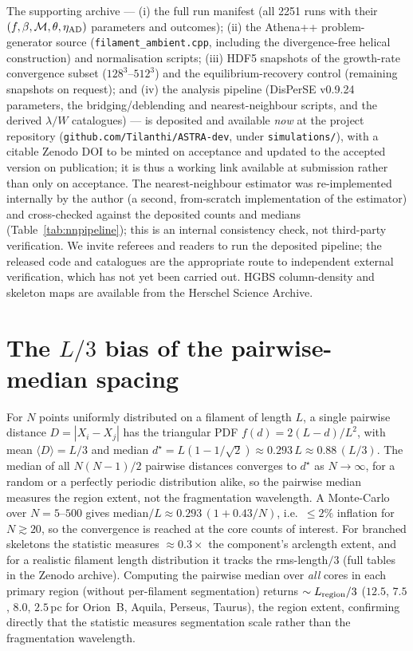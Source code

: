\documentclass[usenatbib,twoside,twocolumn]{mnras}
\begin{document}
The supporting archive --- (i) the full run manifest (all 2251 runs with their $(f,\beta,\mathcal{M},\theta,\eta_{\rm AD})$ parameters and outcomes); (ii) the Athena++ problem-generator source (\texttt{filament\_ambient.cpp}, including the divergence-free helical construction) and normalisation scripts; (iii) HDF5 snapshots of the growth-rate convergence subset ($128^3$--$512^3$) and the equilibrium-recovery control (remaining snapshots on request); and (iv) the analysis pipeline (DisPerSE v0.9.24 parameters, the bridging/deblending and nearest-neighbour scripts, and the derived $\lambda/W$ catalogues) --- is deposited and available \emph{now} at the project repository (\texttt{github.com/Tilanthi/ASTRA-dev}, under \texttt{simulations/}), with a citable Zenodo DOI to be minted on acceptance and updated to the accepted version on publication; it is thus a working link available at submission rather than only on acceptance. The nearest-neighbour estimator was re-implemented internally by the author (a second, from-scratch implementation of the estimator) and cross-checked against the deposited counts and medians (Table~\ref{tab:nnpipeline}); this is an internal consistency check, not third-party verification. We invite referees and readers to run the deposited pipeline; the released code and catalogues are the appropriate route to independent external verification, which has not yet been carried out. HGBS column-density and skeleton maps are available from the Herschel Science Archive.


\appendix

\section{The $L/3$ bias of the pairwise-median spacing}
\label{sec:pwmedian}
For $N$ points uniformly distributed on a filament of length $L$, a single pairwise distance $D=|X_i-X_j|$ has the triangular PDF $f(d)=2(L-d)/L^2$, with mean $\langle D\rangle=L/3$ and median $d^\star=L(1-1/\sqrt{2})\approx0.293\,L\approx0.88\,(L/3)$. The median of all $N(N-1)/2$ pairwise distances converges to $d^\star$ as $N\to\infty$, for a random or a perfectly periodic distribution alike, so the pairwise median measures the region extent, not the fragmentation wavelength. A Monte-Carlo over $N=5$--$500$ gives median$/L\approx0.293\,(1+0.43/N)$, i.e.\ $\le2\%$ inflation for $N\gtrsim20$, so the convergence is reached at the core counts of interest. For branched skeletons the statistic measures $\approx0.3\times$ the component's arclength extent, and for a realistic filament length distribution it tracks the rms-length$/3$ (full tables in the Zenodo archive). Computing the pairwise median over \emph{all} cores in each primary region (without per-filament segmentation) returns $\sim L_{\rm region}/3$ ($12.5$, $7.5$, $8.0$, $2.5$\,pc for Orion~B, Aquila, Perseus, Taurus), the region extent, confirming directly that the statistic measures segmentation scale rather than the fragmentation wavelength.
\end{document}
